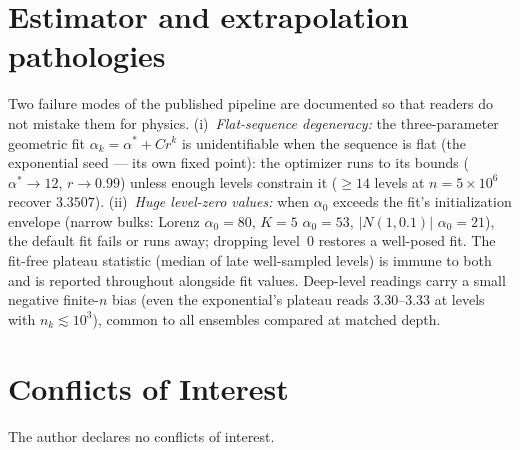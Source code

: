 \documentclass[11pt,a4paper]{article}
\theoremstyle{remark}
\begin{document}
\section{Estimator and extrapolation pathologies}\label{app:pathologies}

Two failure modes of the published pipeline are documented so that readers do not mistake them for
physics. (i)~\emph{Flat-sequence degeneracy:} the three-parameter geometric fit
$\alpha_k = \alpha^* + Cr^k$ is unidentifiable when the sequence is flat (the exponential seed ---
its own fixed point): the optimizer runs to its bounds ($\alpha^* \to 12$, $r \to 0.99$) unless
enough levels constrain it ($\ge 14$ levels at $n = 5\times10^{6}$ recover $3.3507$). (ii)~\emph{Huge
level-zero values:} when $\alpha_0$ exceeds the fit's initialization envelope (narrow bulks: Lorenz
$\alpha_0 = 80$, $K{=}5$ $\alpha_0 = 53$, $|N(1,0.1)|$ $\alpha_0 = 21$), the default fit fails or
runs away; dropping level~0 restores a well-posed fit. The fit-free plateau statistic (median of
late well-sampled levels) is immune to both and is reported throughout alongside fit values.
Deep-level readings carry a small negative finite-$n$ bias (even the exponential's plateau reads
$3.30$--$3.33$ at levels with $n_k \lesssim 10^{3}$), common to all ensembles compared at matched
depth.

\section*{Conflicts of Interest}
The author declares no conflicts of interest.
\end{document}
